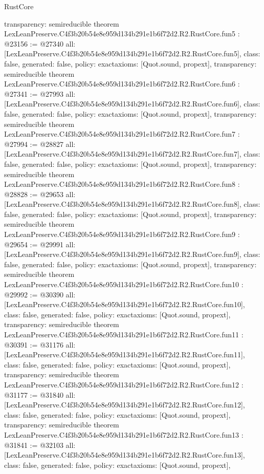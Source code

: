 \begin{lexlean}{RustCore}
\begin{coremodule}
{  transparency: semireducible
}
theorem LexLeanPreserve.C4f3b20b54e8e959d134b291e1b6f72d2.R2.RustCore.fun5 : @23156 := @27340 {
  all: [LexLeanPreserve.C4f3b20b54e8e959d134b291e1b6f72d2.R2.RustCore.fun5],
  class: false,
  generated: false,
  policy: exact{axioms: [Quot.sound, propext]},
  transparency: semireducible
}
theorem LexLeanPreserve.C4f3b20b54e8e959d134b291e1b6f72d2.R2.RustCore.fun6 : @27341 := @27993 {
  all: [LexLeanPreserve.C4f3b20b54e8e959d134b291e1b6f72d2.R2.RustCore.fun6],
  class: false,
  generated: false,
  policy: exact{axioms: [Quot.sound, propext]},
  transparency: semireducible
}
theorem LexLeanPreserve.C4f3b20b54e8e959d134b291e1b6f72d2.R2.RustCore.fun7 : @27994 := @28827 {
  all: [LexLeanPreserve.C4f3b20b54e8e959d134b291e1b6f72d2.R2.RustCore.fun7],
  class: false,
  generated: false,
  policy: exact{axioms: [Quot.sound, propext]},
  transparency: semireducible
}
theorem LexLeanPreserve.C4f3b20b54e8e959d134b291e1b6f72d2.R2.RustCore.fun8 : @28828 := @29653 {
  all: [LexLeanPreserve.C4f3b20b54e8e959d134b291e1b6f72d2.R2.RustCore.fun8],
  class: false,
  generated: false,
  policy: exact{axioms: [Quot.sound, propext]},
  transparency: semireducible
}
theorem LexLeanPreserve.C4f3b20b54e8e959d134b291e1b6f72d2.R2.RustCore.fun9 : @29654 := @29991 {
  all: [LexLeanPreserve.C4f3b20b54e8e959d134b291e1b6f72d2.R2.RustCore.fun9],
  class: false,
  generated: false,
  policy: exact{axioms: [Quot.sound, propext]},
  transparency: semireducible
}
theorem LexLeanPreserve.C4f3b20b54e8e959d134b291e1b6f72d2.R2.RustCore.fun10 : @29992 := @30390 {
  all: [LexLeanPreserve.C4f3b20b54e8e959d134b291e1b6f72d2.R2.RustCore.fun10],
  class: false,
  generated: false,
  policy: exact{axioms: [Quot.sound, propext]},
  transparency: semireducible
}
theorem LexLeanPreserve.C4f3b20b54e8e959d134b291e1b6f72d2.R2.RustCore.fun11 : @30391 := @31176 {
  all: [LexLeanPreserve.C4f3b20b54e8e959d134b291e1b6f72d2.R2.RustCore.fun11],
  class: false,
  generated: false,
  policy: exact{axioms: [Quot.sound, propext]},
  transparency: semireducible
}
theorem LexLeanPreserve.C4f3b20b54e8e959d134b291e1b6f72d2.R2.RustCore.fun12 : @31177 := @31840 {
  all: [LexLeanPreserve.C4f3b20b54e8e959d134b291e1b6f72d2.R2.RustCore.fun12],
  class: false,
  generated: false,
  policy: exact{axioms: [Quot.sound, propext]},
  transparency: semireducible
}
theorem LexLeanPreserve.C4f3b20b54e8e959d134b291e1b6f72d2.R2.RustCore.fun13 : @31841 := @32103 {
  all: [LexLeanPreserve.C4f3b20b54e8e959d134b291e1b6f72d2.R2.RustCore.fun13],
  class: false,
  generated: false,
  policy: exact{axioms: [Quot.sound, propext]},
}
\end{coremodule}
\end{lexlean}
